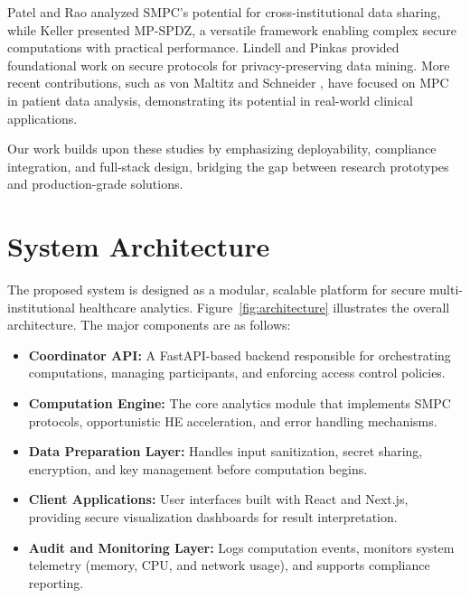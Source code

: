 \documentclass[conference]{IEEEtran}
\begin{document}
Patel and Rao \cite{patel2024} analyzed SMPC’s potential for cross-institutional data sharing, while Keller \cite{keller2020} presented MP-SPDZ, a versatile framework enabling complex secure computations with practical performance. Lindell and Pinkas \cite{lindell2009} provided foundational work on secure protocols for privacy-preserving data mining. More recent contributions, such as von Maltitz and Schneider \cite{maltitz2024}, have focused on MPC in patient data analysis, demonstrating its potential in real-world clinical applications.

Our work builds upon these studies by emphasizing deployability, compliance integration, and full-stack design, bridging the gap between research prototypes and production-grade solutions.

\section{System Architecture}
The proposed system is designed as a modular, scalable platform for secure multi-institutional healthcare analytics. Figure~\ref{fig:architecture} illustrates the overall architecture. The major components are as follows:

\begin{itemize}
    \item \textbf{Coordinator API:} A FastAPI-based backend responsible for orchestrating computations, managing participants, and enforcing access control policies.
    \item \textbf{Computation Engine:} The core analytics module that implements SMPC protocols, opportunistic HE acceleration, and error handling mechanisms.
    \item \textbf{Data Preparation Layer:} Handles input sanitization, secret sharing, encryption, and key management before computation begins.
    \item \textbf{Client Applications:} User interfaces built with React and Next.js, providing secure visualization dashboards for result interpretation.
    \item \textbf{Audit and Monitoring Layer:} Logs computation events, monitors system telemetry (memory, CPU, and network usage), and supports compliance reporting.
\end{itemize}
\end{document}
